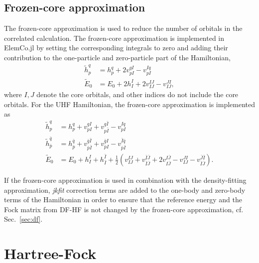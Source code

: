 \documentclass[a4paper,12pt,oneside]{book}
\newcommand{\half}{\frac{1}{2}}
\newcommand{\sect}[1]{Sec.~\ref{#1}}
\newcommand{\spa}[1]{{#1}}
\newcommand{\spb}[1]{\bar{#1}}
\newcommand{\ElemCojl}{\textsf{ElemCo.jl} }
\begin{document}
\section{Frozen-core approximation}
\label{sec:frozen-core}
The frozen-core approximation is used to reduce the number of orbitals in the correlated 
calculation. The frozen-core approximation is implemented in \ElemCojl by
setting the corresponding integrals to zero and adding their contribution to the
one-particle and zero-particle part of the Hamiltonian,
\begin{equation}
  \begin{aligned}
    \tilde h_p^q &= h_p^q + 2 v_{pI}^{qI} - v_{pI}^{Iq}\\
    \tilde E_0 &= E_0 + 2 h_I^I + 2 v_{IJ}^{IJ} - v_{IJ}^{JI},
  \end{aligned}
\end{equation}
where $I, J$ denote the core orbitals, and other indices do not include the core orbitals.
For the UHF Hamiltonian, the frozen-core approximation is implemented as
\begin{equation}
  \begin{aligned}
    \tilde h_{\spa p}^{\spa q} &= h_{\spa p}^{\spa q} + v_{\spa p \spa I}^{\spa q\spa I} + 
    v_{\spa p \spb I}^{\spa q\spb I} - v_{\spa p\spa I}^{\spa I\spa q}\\
    \tilde h_{\spb p}^{\spb q} &= h_{\spb p}^{\spb q} + v_{\spb p \spb I}^{\spb q\spb I} + 
    v_{\spb p \spa I}^{\spb q\spa I} - v_{\spb p\spb I}^{\spb I\spb q}\\
    \tilde E_0 &= E_0 + h_{\spa I}^{\spa I} + h_{\spb I}^{\spb I} + 
    \half\left(v_{\spa I\spa J}^{\spa I\spa J} + v_{\spb I\spb J}^{\spb I\spb J} 
    + 2 v_{\spa I\spb J}^{\spa I\spb J}
    - v_{\spa I\spa J}^{\spa J\spa I} - v_{\spb I\spb J}^{\spb J\spb I}
    \right).
  \end{aligned}
\end{equation}

If the frozen-core approximation is used in combination with the density-fitting approximation,
\textit{jkfit} correction terms are added to the one-body and zero-body terms of the Hamiltonian in order to ensure that the
reference energy and the Fock matrix from DF-HF is not changed by the frozen-core approximation,
cf. \sect{sec:df}.

\chapter{Hartree-Fock}
\end{document}
